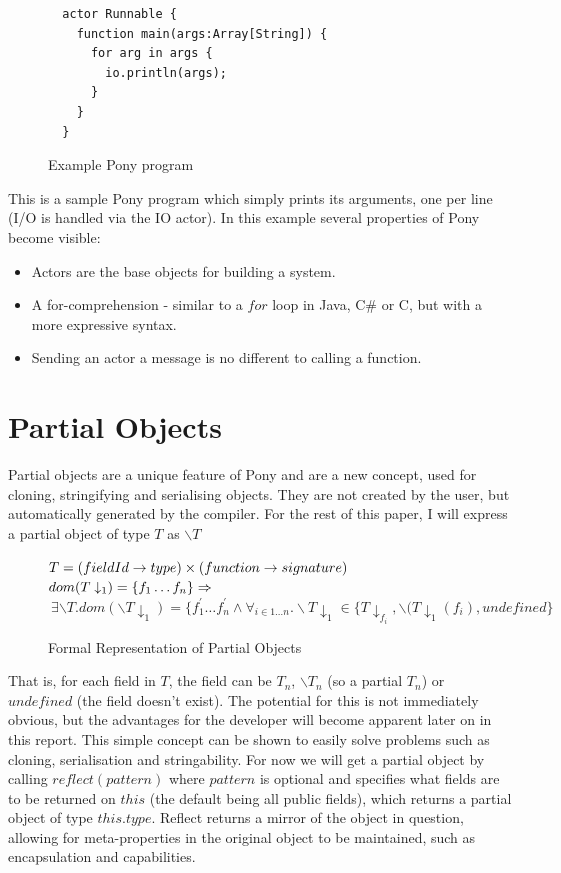 \documentclass[11pt,a4paper]{report}
\begin{document}
\begin{figure}[H]
\begin{verbatim}
  actor Runnable {
    function main(args:Array[String]) {
      for arg in args {
      	io.println(args);
      }
    }
  }
\end{verbatim}
\caption{Example Pony program}
\label{fig:simple}
\end{figure}

This is a sample Pony program which simply prints its arguments, one per line (I/O is handled via the IO actor).
In this example several properties of Pony become visible:
\begin{itemize}
\item Actors are the base objects for building a system.
\item A for-comprehension - similar to a $for$ loop in Java, C\# or C, but with
      a more expressive syntax.
\item Sending an actor a message is no different to calling a function.
\end{itemize}

\section{Partial Objects}

Partial objects are a unique feature of Pony and are a new concept, used for cloning, stringifying and serialising objects.
They are not created by the user, but automatically generated by the compiler.
For the rest of this paper, I will express a partial object of type $T$ as $\backslash T$

\begin{figure}[H]
$T = (fieldId \to type) \times (function \to signature)\\$
$dom(T\downarrow_{1}) = \{ f_{1} \dots f_{n} \} \Rightarrow\\$
$\> \exists \backslash T.dom(\backslash T\downarrow_{1}) = \{f_{1}^{'}\dots f_{n}^{'}\wedge
\forall_{i\in 1\dots n}.\backslash T\downarrow_{1} \in \{T\downarrow_{f_{i}},
\backslash(T\downarrow_{1}(f_{i}), undefined\}$
\caption{Formal Representation of Partial Objects}
\end{figure}

That is, for each field in $T$, the field can be $T_{n}$, $\backslash T_{n}$ (so a partial $T_{n}$) or $undefined$ (the field doesn't exist).
The potential for this is not immediately obvious, but the advantages for the developer will become apparent later on in this report.
This simple concept can be shown to easily solve problems such as cloning, serialisation and stringability.
For now we will get a partial object by calling $reflect(pattern)$ where $pattern$ is optional and specifies what fields are to be returned on $this$ (the default being all public fields), which returns a partial object of type $this.type$.
Reflect returns a mirror\cite{mirror-paper} of the object in question, allowing for meta-properties in the original object to be maintained, such as encapsulation and capabilities.
\end{document}
